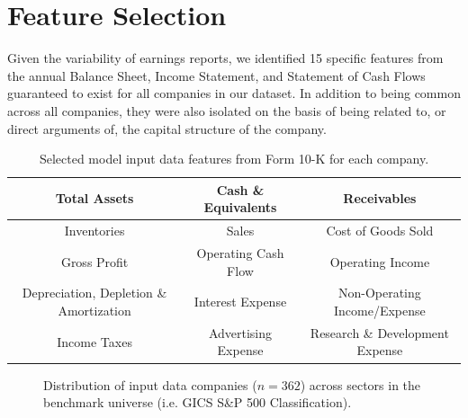 \documentclass[../main.tex]{subfiles}
\begin{document}
\section{Feature Selection}

Given the variability of earnings reports, we identified 15 specific features from the annual Balance Sheet, Income Statement, and Statement of Cash Flows guaranteed to exist for all companies in our dataset. In addition to being common across all companies, they were also isolated on the basis of being related to, or direct arguments of, the capital structure of the company.

\begin{table}[h]
    \centering
    \begin{tabular}{|c|c|c|}
        \hline
        Total Assets & Cash \& Equivalents & Receivables \\
        \hline
        Inventories & Sales & Cost of Goods Sold \\
        \hline
        Gross Profit & Operating Cash Flow & Operating Income \\
        \hline
        Depreciation, Depletion \& Amortization & Interest Expense & Non-Operating Income/Expense \\
        \hline
        Income Taxes & Advertising Expense & Research \& Development Expense \\
        \hline
    \end{tabular}
    \caption{Selected model input data features from Form 10-K for each company.}
    \label{table:model_data:features}
\end{table}

\pagebreak

\begin{figure}[h]
    \centering
    \caption{Distribution of input data companies ($n = 362$) across sectors in the benchmark universe (i.e. GICS S\&P 500 Classification).}
    \label{fig:model_data:sp500_sector_distribution}
\end{figure}
\end{document}
